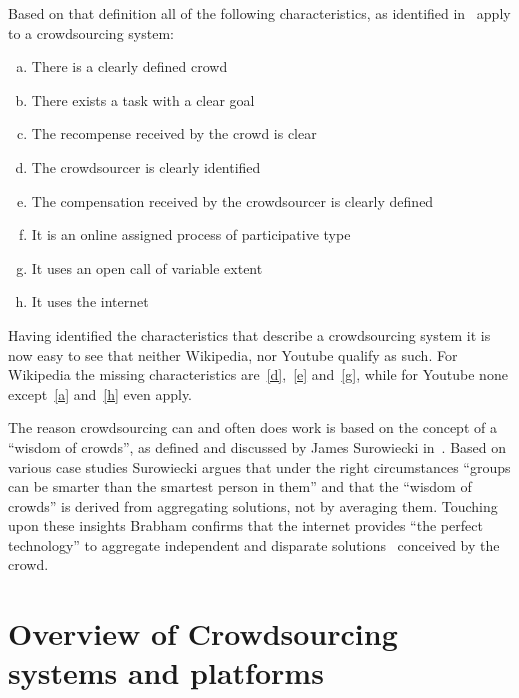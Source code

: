 \documentclass{sig-alternate}
\begin{document}
Based on that definition all of the following characteristics, as identified
in~\cite{estelles2012towards} apply to a crowdsourcing system:

\begin{enumerate}[(a)]
	\item There is a clearly defined crowd\label{a}
	\item There exists a task with a clear goal\label{b}
	\item The recompense received by the crowd is clear\label{c}
	\item The crowdsourcer is clearly identified\label{d}
	\item The compensation received by the crowdsourcer is clearly defined\label{e}
	\item It is an online assigned process of participative type\label{f}
	\item It uses an open call of variable extent\label{g}
	\item It uses the internet\label{h}
\end{enumerate}

Having identified the characteristics that describe a crowdsourcing system it
is now easy to see that neither Wikipedia, nor Youtube qualify as such. For
Wikipedia the missing characteristics are~\ref{d},~\ref{e} and~\ref{g}, while
for Youtube none except~\ref{a} and~\ref{h} even apply.

The reason crowdsourcing can and often does work is based on the concept of a
``wisdom of crowds'', as defined and discussed by James Surowiecki
in~\cite{surowiecki2004wisdom}.  Based on various case studies Surowiecki
argues that under the right circumstances ``groups can be smarter than the
smartest person in them'' and that the ``wisdom of crowds'' is derived from
aggregating solutions, not by averaging them. Touching upon these insights
Brabham confirms that the internet provides ``the perfect technology'' to
aggregate independent and disparate solutions~\cite{brabham2008crowdsourcing}
conceived by the crowd.


\section{Overview of Crowdsourcing systems and platforms}
\end{document}
